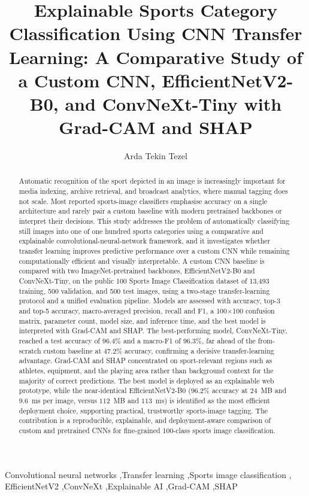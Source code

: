 \documentclass[review]{elsarticle}
\newcommand{\bestModel}{ConvNeXt-Tiny}
\begin{document}
\begin{frontmatter}

\title{Explainable Sports Category Classification Using CNN Transfer Learning:
A Comparative Study of a Custom CNN, EfficientNetV2-B0, and ConvNeXt-Tiny
with Grad-CAM and SHAP}

\author{Arda Tekin Tezel}
\address{University of Europe for Applied Sciences, Potsdam, Germany}

\begin{abstract}
Automatic recognition of the sport depicted in an image is increasingly important for media
indexing, archive retrieval, and broadcast analytics, where manual tagging does not scale.
Most reported sports-image classifiers emphasise accuracy on a single architecture and rarely
pair a custom baseline with modern pretrained backbones or interpret their decisions.
This study addresses the problem of automatically classifying still images into one of one hundred
sports categories using a comparative and explainable convolutional-neural-network framework, and it
investigates whether transfer learning improves predictive performance over a custom CNN while
remaining computationally efficient and visually interpretable.
A custom CNN baseline is compared with two ImageNet-pretrained backbones, EfficientNetV2-B0 and
ConvNeXt-Tiny, on the public 100 Sports Image Classification dataset of 13{,}493 training, 500
validation, and 500 test images, using a two-stage transfer-learning protocol and a unified
evaluation pipeline.
Models are assessed with accuracy, top-3 and top-5 accuracy, macro-averaged precision, recall and
F1, a 100$\times$100 confusion matrix, parameter count, model size, and inference time, and the best
model is interpreted with Grad-CAM and SHAP.
The best-performing model, \bestModel, reached a test accuracy of $96.4\%$ and a macro-F1 of
$96.3\%$, far ahead of the from-scratch custom baseline at $47.2\%$ accuracy, confirming a decisive
transfer-learning advantage.
Grad-CAM and SHAP concentrated on sport-relevant regions such as athletes, equipment, and the
playing area rather than background context for the majority of correct predictions.
The best model is deployed as an explainable web prototype, while the near-identical
EfficientNetV2-B0 ($96.2\%$ accuracy at $24$~MB and $9.6$~ms per image, versus $112$~MB and $113$~ms)
is identified as the most efficient deployment choice, supporting practical, trustworthy
sports-image tagging.
The contribution is a reproducible, explainable, and deployment-aware comparison of custom and
pretrained CNNs for fine-grained 100-class sports image classification.
\end{abstract}

\begin{keyword}
Convolutional neural networks \sep Transfer learning \sep Sports image classification \sep
EfficientNetV2 \sep ConvNeXt \sep Explainable AI \sep Grad-CAM \sep SHAP
\end{keyword}

\end{frontmatter}
\end{document}
